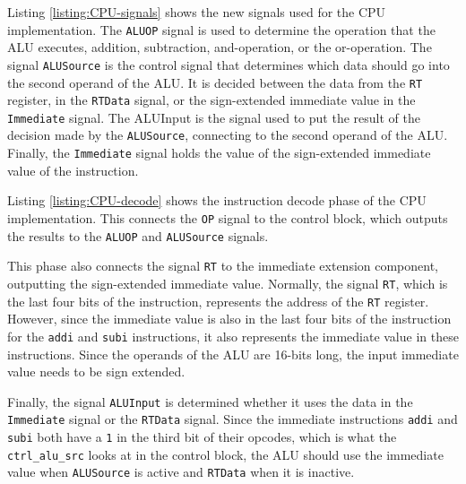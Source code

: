 \documentclass[11pt]{report}
\begin{document}
Listing \ref{listing:CPU-signals} shows the new signals used for the CPU implementation.
The \verb|ALUOP| signal is used to determine the operation that the ALU executes, addition,
subtraction, and-operation, or the or-operation. The signal \verb|ALUSource| is the control signal
that determines which data should go into the second operand of the ALU. It is decided between the
data from the \verb|RT| register, in the \verb|RTData| signal, or the sign-extended immediate value
in the \verb|Immediate| signal. The ALUInput is the signal used to put the result of the decision
made by the \verb|ALUSource|, connecting to the second operand of the ALU. Finally, the
\verb|Immediate| signal holds the value of the sign-extended immediate value of the instruction.

\newpage


Listing \ref{listing:CPU-decode} shows the instruction decode phase of the CPU implementation. This
connects the \verb|OP| signal to the control block, which outputs the results to the \verb|ALUOP|
and \verb|ALUSource| signals.

This phase also connects the signal \verb|RT| to the immediate extension component, outputting the
sign-extended immediate value. Normally, the signal \verb|RT|, which is the last four bits of the
instruction, represents the address of the \verb|RT| register. However, since the immediate value is
also in the last four bits of the instruction for the \verb|addi| and \verb|subi| instructions, it
also represents the immediate value in these instructions. Since the operands of the ALU are 16-bits
long, the input immediate value needs to be sign extended.

Finally, the signal \verb|ALUInput| is determined whether it uses the data in the \verb|Immediate|
signal or the \verb|RTData| signal. Since the immediate instructions \verb|addi| and \verb|subi|
both have a \verb|1| in the third bit of their opcodes, which is what the \verb|ctrl_alu_src| looks
at in the control block, the ALU should use the immediate value when \verb|ALUSource| is active and
\verb|RTData| when it is inactive.
\end{document}
